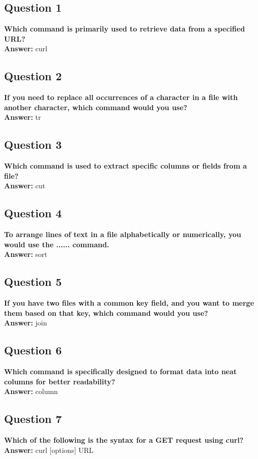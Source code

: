 \documentclass[11pt,parskip]{scrartcl}
\begin{document}
\subsection*{Question 1}
\textbf{Which command is primarily used to retrieve data from a specified URL?} \\
\textbf{Answer:} curl

\subsection*{Question 2}
\textbf{If you need to replace all occurrences of a character in a file with another character, which command would you use?} \\
\textbf{Answer:} tr

\subsection*{Question 3}
\textbf{Which command is used to extract specific columns or fields from a file?} \\
\textbf{Answer:} cut

\subsection*{Question 4} 
\textbf{To arrange lines of text in a file alphabetically or numerically, you would use the ...... command.} \\
\textbf{Answer:} sort

\subsection*{Question 5}
\textbf{If you have two files with a common key field, and you want to merge them based on that key, which command would you use?} \\
\textbf{Answer:} join

\subsection*{Question 6} 
\textbf{Which command is specifically designed to format data into neat columns for better readability?} \\
\textbf{Answer:} column

\subsection*{Question 7}
\textbf{Which of the following is the syntax for a GET request using curl?} \\
\textbf{Answer:} curl [options] URL
\end{document}
